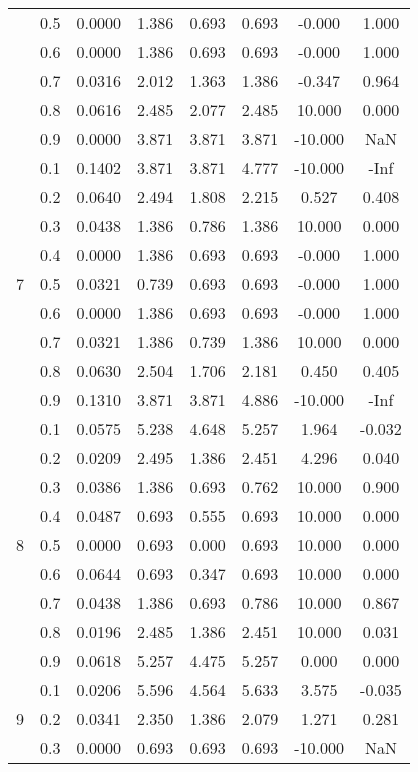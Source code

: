 \documentclass[11pt,a4paper]{report}
\begin{document}
\begin{longtable}{ | c | c || c | c | c | c | c | c | }
 & 0.5 & 0.0000 & 1.386 & 0.693 & 0.693 & -0.000 & 1.000 \\
 & 0.6 & 0.0000 & 1.386 & 0.693 & 0.693 & -0.000 & 1.000 \\
 & 0.7 & 0.0316 & 2.012 & 1.363 & 1.386 & -0.347 & 0.964 \\
 & 0.8 & 0.0616 & 2.485 & 2.077 & 2.485 & 10.000 & 0.000 \\
 & 0.9 & 0.0000 & 3.871 & 3.871 & 3.871 & -10.000 & NaN \\
 \hline
\multirow{9}{*}{7} & 0.1 & 0.1402 & 3.871 & 3.871 & 4.777 & -10.000 & -Inf \\
 & 0.2 & 0.0640 & 2.494 & 1.808 & 2.215 & 0.527 & 0.408 \\
 & 0.3 & 0.0438 & 1.386 & 0.786 & 1.386 & 10.000 & 0.000 \\
 & 0.4 & 0.0000 & 1.386 & 0.693 & 0.693 & -0.000 & 1.000 \\
 & 0.5 & 0.0321 & 0.739 & 0.693 & 0.693 & -0.000 & 1.000 \\
 & 0.6 & 0.0000 & 1.386 & 0.693 & 0.693 & -0.000 & 1.000 \\
 & 0.7 & 0.0321 & 1.386 & 0.739 & 1.386 & 10.000 & 0.000 \\
 & 0.8 & 0.0630 & 2.504 & 1.706 & 2.181 & 0.450 & 0.405 \\
 & 0.9 & 0.1310 & 3.871 & 3.871 & 4.886 & -10.000 & -Inf \\
 \hline
\multirow{9}{*}{8} & 0.1 & 0.0575 & 5.238 & 4.648 & 5.257 & 1.964 & -0.032 \\
 & 0.2 & 0.0209 & 2.495 & 1.386 & 2.451 & 4.296 & 0.040 \\
 & 0.3 & 0.0386 & 1.386 & 0.693 & 0.762 & 10.000 & 0.900 \\
 & 0.4 & 0.0487 & 0.693 & 0.555 & 0.693 & 10.000 & 0.000 \\
 & 0.5 & 0.0000 & 0.693 & 0.000 & 0.693 & 10.000 & 0.000 \\
 & 0.6 & 0.0644 & 0.693 & 0.347 & 0.693 & 10.000 & 0.000 \\
 & 0.7 & 0.0438 & 1.386 & 0.693 & 0.786 & 10.000 & 0.867 \\
 & 0.8 & 0.0196 & 2.485 & 1.386 & 2.451 & 10.000 & 0.031 \\
 & 0.9 & 0.0618 & 5.257 & 4.475 & 5.257 & 0.000 & 0.000 \\
 \hline
\multirow{9}{*}{9} & 0.1 & 0.0206 & 5.596 & 4.564 & 5.633 & 3.575 & -0.035 \\
 & 0.2 & 0.0341 & 2.350 & 1.386 & 2.079 & 1.271 & 0.281 \\
 & 0.3 & 0.0000 & 0.693 & 0.693 & 0.693 & -10.000 & NaN \\

\end{longtable}
\end{document}
